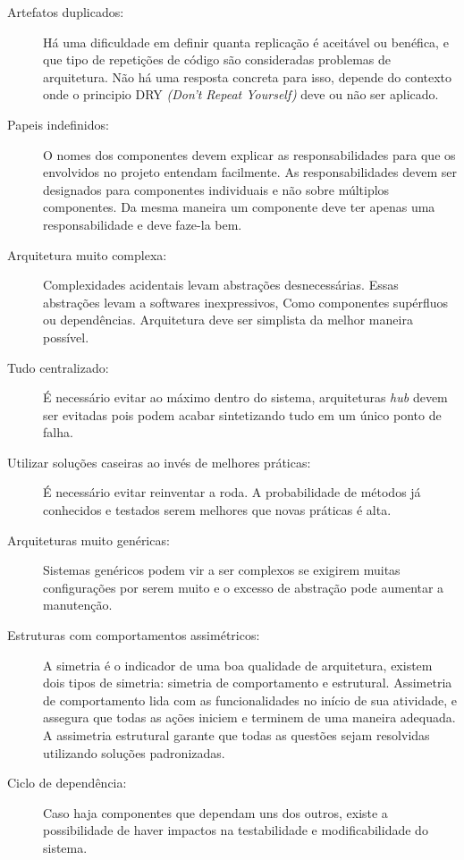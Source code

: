 \begin{description}

\item[Artefatos duplicados:] Há uma dificuldade em definir quanta replicação é aceitável ou benéfica, e que tipo de repetições de código são consideradas problemas de arquitetura. Não há uma resposta concreta para isso, depende do contexto onde o principio DRY \textit{(Don't Repeat Yourself)} deve ou não ser aplicado.

\item[Papeis indefinidos:] O nomes dos componentes devem explicar as responsabilidades para que os envolvidos no projeto entendam facilmente. As responsabilidades devem ser designados para componentes individuais e não sobre múltiplos componentes. Da mesma maneira um componente deve ter apenas uma responsabilidade e deve faze-la bem.

\item[Arquitetura muito complexa:] Complexidades acidentais levam abstrações desnecessárias. Essas abstrações levam a softwares inexpressivos, Como componentes supérfluos ou dependências. Arquitetura deve ser simplista da melhor maneira possível.

\item[Tudo centralizado:] É necessário evitar ao máximo dentro do sistema, arquiteturas \textit{hub} devem ser evitadas pois podem acabar sintetizando tudo em um único ponto de falha.

\item[Utilizar soluções caseiras ao invés de melhores práticas:] É necessário evitar reinventar a roda. A probabilidade de métodos já conhecidos e testados serem melhores que novas práticas é alta.

\item[Arquiteturas muito genéricas:] Sistemas genéricos podem vir a ser complexos se exigirem muitas configurações por serem muito e o excesso de abstração pode aumentar a manutenção.

\item[Estruturas com comportamentos assimétricos:]
A simetria é o indicador de uma boa qualidade de arquitetura, existem dois tipos de simetria: simetria de comportamento e estrutural. Assimetria de comportamento lida com as funcionalidades no início de sua atividade, e assegura que todas as ações iniciem e terminem de uma maneira adequada. A assimetria estrutural garante que todas as questões sejam resolvidas utilizando soluções padronizadas.

\item[Ciclo de dependência:]
Caso haja componentes que dependam uns dos outros, existe a possibilidade de haver impactos na testabilidade e modificabilidade do sistema.


\end{description}
